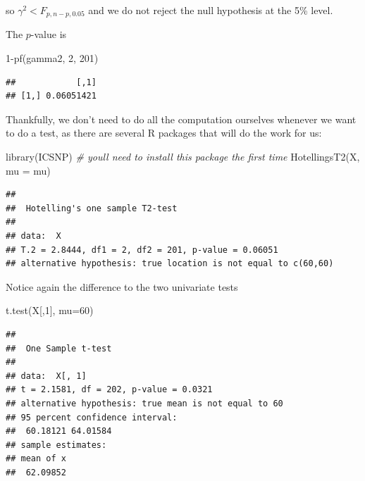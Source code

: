 \documentclass[
]{book}
\newenvironment{Shaded}{\begin{snugshade}}{\end{snugshade}}
\newcommand{\AttributeTok}[1]{\textcolor[rgb]{0.77,0.63,0.00}{#1}}
\newcommand{\CommentTok}[1]{\textcolor[rgb]{0.56,0.35,0.01}{\textit{#1}}}
\newcommand{\DecValTok}[1]{\textcolor[rgb]{0.00,0.00,0.81}{#1}}
\newcommand{\FunctionTok}[1]{\textcolor[rgb]{0.00,0.00,0.00}{#1}}
\newcommand{\NormalTok}[1]{#1}
\newcommand{\SpecialCharTok}[1]{\textcolor[rgb]{0.00,0.00,0.00}{#1}}
\theoremstyle{definition}
\theoremstyle{definition}
\theoremstyle{definition}
\theoremstyle{definition}
\theoremstyle{remark}
\begin{document}
so \(\gamma^2 < F_{p,n-p,0.05}\) and we do not reject the null hypothesis at the 5\% level.

The \(p\)-value is

\begin{Shaded}
\begin{Highlighting}[]
\DecValTok{1}\SpecialCharTok{{-}}\FunctionTok{pf}\NormalTok{(gamma2, }\DecValTok{2}\NormalTok{, }\DecValTok{201}\NormalTok{)}
\end{Highlighting}
\end{Shaded}

\begin{verbatim}
##            [,1]
## [1,] 0.06051421
\end{verbatim}

Thankfully, we don't need to do all the computation ourselves whenever we want to do a test, as there are several R packages that will do the work for us:

\begin{Shaded}
\begin{Highlighting}[]
\FunctionTok{library}\NormalTok{(ICSNP) }\CommentTok{\# you\textquotesingle{}ll need to install this package the first time}
\FunctionTok{HotellingsT2}\NormalTok{(X,  }\AttributeTok{mu =}\NormalTok{ mu)}
\end{Highlighting}
\end{Shaded}

\begin{verbatim}
## 
##  Hotelling's one sample T2-test
## 
## data:  X
## T.2 = 2.8444, df1 = 2, df2 = 201, p-value = 0.06051
## alternative hypothesis: true location is not equal to c(60,60)
\end{verbatim}

Notice again the difference to the two univariate tests

\begin{Shaded}
\begin{Highlighting}[]
\FunctionTok{t.test}\NormalTok{(X[,}\DecValTok{1}\NormalTok{], }\AttributeTok{mu=}\DecValTok{60}\NormalTok{)}
\end{Highlighting}
\end{Shaded}

\begin{verbatim}
## 
##  One Sample t-test
## 
## data:  X[, 1]
## t = 2.1581, df = 202, p-value = 0.0321
## alternative hypothesis: true mean is not equal to 60
## 95 percent confidence interval:
##  60.18121 64.01584
## sample estimates:
## mean of x 
##  62.09852
\end{verbatim}
\end{document}
